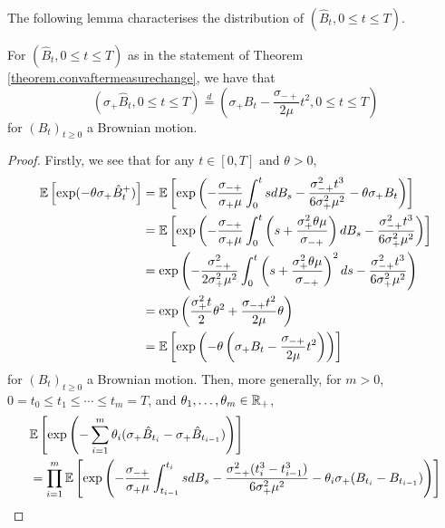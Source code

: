  The following lemma characterises the distribution of $(\hat{B}_t, {0\leq t\leq T})$.
 \begin{lemma}\label{lemma.characterizelimitprocess}
 For $(\hat{B}_t, {0\leq t\leq T})$ as in the statement of Theorem \ref{theorem.convaftermeasurechange}, we have that 
 $$(\sigma_+ \hat{B}_t, {0\leq t\leq T})\overset{d}{=}\left(\sigma_+ B_t-\frac{\sigma_{-+}}{2\mu}t^2, {0\leq t\leq T}\right)$$
 for $(B_t)_{t\geq 0}$ a Brownian motion.
 \end{lemma}
 \begin{proof}
 Firstly, we see that for any $t\in [0,T]$ and $\theta>0$,
 \begin{align*} {\mathbb E}\left[\exp(-\theta \sigma_+ \hat{B}_t^+)\right] &= {\mathbb E} \left[ \exp\left(-\frac{\sigma_{-+}}{\sigma_+ \mu}\int_0^t s dB_s-\frac{\sigma_{-+}^2 t^3}{6\sigma_+^2\mu^2}-\theta\sigma_+ B_t  \right)\right]\\
 &={\mathbb E}\left[\exp \left( -\frac{\sigma_{-+}}{\sigma_+ \mu}\int_0^t \left(s+\frac{\sigma_+^2\theta \mu}{\sigma_{-+}}\right) dB_s -\frac{\sigma_{-+}^2 t^3}{6\sigma_+^2\mu^2}\right)\right] \\
 &= \exp\left(-\frac{\sigma_{-+}^2}{2\sigma_+^2 \mu^2}\int_0^t \left(s+\frac{\sigma_+^2\theta \mu}{\sigma_{-+}}\right)^2 ds -\frac{\sigma_{-+}^2 t^3}{6\sigma_+^2\mu^2}\right)\\
 &=\exp\left(\frac{\sigma_+^2 t}{2}\theta^2+\frac{\sigma_{-+} t^2}{2\mu}\theta \right)\\
 &= {\mathbb E} \left[\exp\left(-\theta\left(\sigma_+ B_t - \frac{\sigma_{-+}}{2\mu} t^2\right)\right)\right]
 \end{align*}
 for $(B_t)_{t\geq 0}$ a Brownian motion.
 Then, more generally, for $m>0$, $0=t_0\leq t_1\leq \cdots \leq t_m=T$, and $\theta_1, \dots, \theta_m \in {\mathbb R}_+$, 
 \begin{align*}
     &\E\left[\exp\left(-\sum_{i=1}^m \theta_i(\sigma_+\hat{B}_{t_i}-\sigma_+\hat{B}_{t_{i-1}})\right)\right]\\
     &= \prod_{i=1}^m \E\left[\exp\left(-\frac{\sigma_{-+}}{\sigma_+\mu} \int _{t_{i-1}}^{t_i} s dB_s-\frac{\sigma_{-+}^2 (t_i^3-t_{i-1}^3)}{6\sigma_+^2 \mu^2}-\theta_i \sigma_+  (B_{t_i}-B_{t_{i-1}})\right)\right]\\

\end{align*}
\end{proof}
